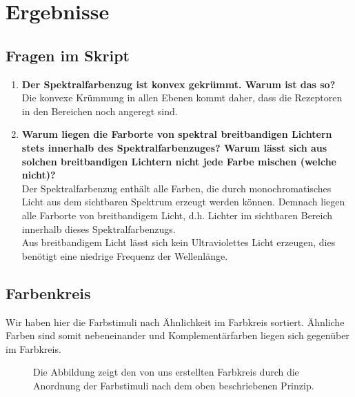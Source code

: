 \documentclass[11pt]{article}
\begin{document}
\section{Ergebnisse}
\subsection{Fragen im Skript}
\begin{enumerate}
\item \textbf{Der Spektralfarbenzug ist konvex gekrümmt. Warum ist das so?}\\
Die konvexe Krümmung in allen Ebenen kommt daher, dass die Rezeptoren in den Bereichen noch angeregt sind.

\item \textbf{Warum liegen die Farborte von spektral breitbandigen Lichtern stets innerhalb des Spektralfarbenzuges? Warum lässt sich aus solchen breitbandigen Lichtern nicht jede Farbe mischen (welche nicht)?} \\
Der Spektralfarbenzug enthält alle Farben, die durch monochromatisches Licht aus dem sichtbaren Spektrum erzeugt werden können. Demnach liegen alle Farborte von breitbandigem Licht, d.h. Lichter im sichtbaren Bereich innerhalb dieses Spektralfarbenzugs.  \\
Aus breitbandigem Licht lässt sich kein Ultraviolettes Licht erzeugen, dies benötigt eine niedrige Frequenz der Wellenlänge. 


\end{enumerate}

\subsection{Farbenkreis}
Wir haben hier die Farbstimuli nach Ähnlichkeit im Farbkreis sortiert. Ähnliche Farben sind somit nebeneinander und Komplementärfarben liegen sich gegenüber im Farbkreis. 
\begin{figure}[H]
\caption{Die Abbildung zeigt den von uns erstellten Farbkreis durch die Anordnung der Farbstimuli nach dem oben beschriebenen Prinzip.}
\label{farbkreis}
\end{figure}
\end{document}
